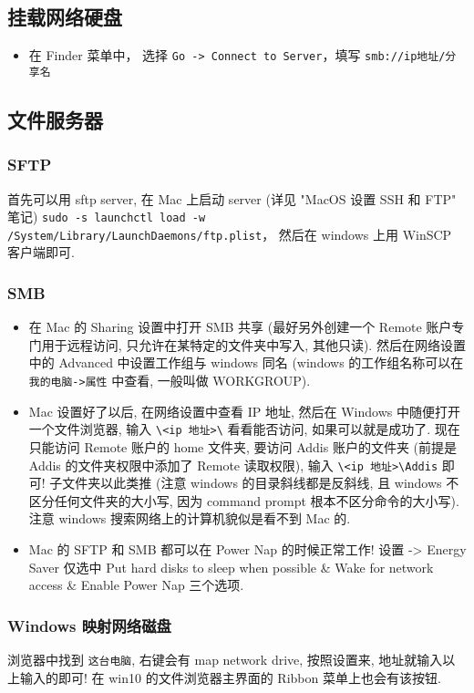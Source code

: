 \subsection{挂载网络硬盘}
\begin{itemize}
\item 在 Finder 菜单中， 选择 \verb`Go -> Connect to Server`，填写 \verb`smb://ip地址/分享名`
\end{itemize}

\subsection{文件服务器}
\subsubsection{SFTP}
首先可以用 sftp server, 在 Mac 上启动 server (详见 "MacOS 设置 SSH 和 FTP" 笔记)
\verb|sudo -s launchctl load -w /System/Library/LaunchDaemons/ftp.plist|， 然后在 windows 上用 WinSCP 客户端即可.

\subsubsection{SMB}
\begin{itemize}
\item 在 Mac 的 Sharing 设置中打开 SMB 共享 (最好另外创建一个 Remote 账户专门用于远程访问, 只允许在某特定的文件夹中写入, 其他只读). 然后在网络设置中的 Advanced 中设置工作组与 windows 同名 (windows 的工作组名称可以在 \verb|我的电脑->属性| 中查看, 一般叫做 WORKGROUP).

\item Mac 设置好了以后, 在网络设置中查看 IP 地址, 然后在 Windows 中随便打开一个文件浏览器, 输入 \verb|\<ip 地址>\| 看看能否访问, 如果可以就是成功了. 现在只能访问 Remote 账户的 home 文件夹, 要访问 Addis 账户的文件夹 (前提是 Addis 的文件夹权限中添加了 Remote 读取权限), 输入 \verb|\<ip 地址>\Addis| 即可! 子文件夹以此类推 (注意 windows 的目录斜线都是反斜线, 且 windows 不区分任何文件夹的大小写, 因为 command prompt 根本不区分命令的大小写). 注意 windows 搜索网络上的计算机貌似是看不到 Mac 的.

\item Mac 的 SFTP 和 SMB 都可以在 Power Nap 的时候正常工作! 设置 -> Energy Saver 仅选中 Put hard disks to sleep when possible \& Wake for network access \& Enable Power Nap 三个选项.
\end{itemize}

\subsubsection{Windows 映射网络磁盘}
浏览器中找到 \verb|这台电脑|, 右键会有 map network drive, 按照设置来, 地址就输入以上输入的即可! 在 win10 的文件浏览器主界面的 Ribbon 菜单上也会有该按钮.

